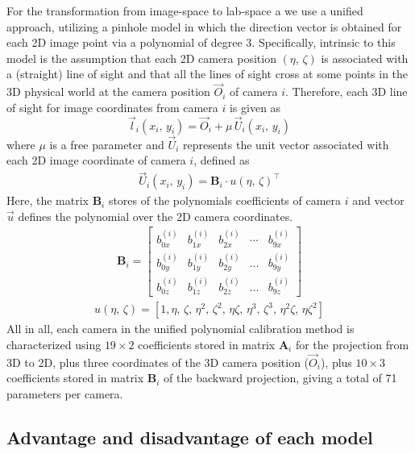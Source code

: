 \documentclass[10pt,a4paper]{article}
\begin{document}
For the transformation from image-space to lab-space a we use a unified approach, utilizing a pinhole model in which the direction vector is obtained for each 2D image point via a polynomial of degree 3. Specifically, intrinsic to this model is the assumption that each 2D camera position $(\eta,\, \zeta)$ is associated with a (straight) line of sight and that all the lines of sight cross at some points in the 3D physical world at the camera position $\vec{O}_i$ of camera $i$. Therefore, each 3D line of sight for image coordinates from camera $i$ is given as
%
\begin{equation}
\vec l_i(x_i, \, y_i) = \vec{O}_i + \mu\,\vec{U}_i(x_i, \, y_i) 
\end{equation}
%
where $\mu$ is a free parameter and $\vec{U}_i$ represents the unit vector associated with each 2D image coordinate of camera $i$, defined as
%
\begin{align}
\label{Eq::extendedSoloff_backwards}
\vec{U}_i(x_i, \, y_i) = \mathbf{B}_i \cdot u(\eta, \, \zeta)^\top
\end{align}
%
Here, the matrix $\mathbf{B}_i$ stores of the polynomials coefficients of camera $i$ and vector $\vec{u}$ defines the polynomial over the 2D camera coordinates.
\begin{align}
\mathbf{B}_i = 
\begin{bmatrix}
b^{(i)}_{0x} & b^{(i)}_{1x} & b^{(i)}_{2x} &  \cdots & b^{(i)}_{9x}\\[2pt]
b^{(i)}_{0y} & b^{(i)}_{1y} & b^{(i)}_{2y} &  \ldots & b^{(i)}_{9y}\\[2pt]
b^{(i)}_{0z} & b^{(i)}_{1z} & b^{(i)}_{2z} &  \ldots & b^{(i)}_{9z}
\end{bmatrix}
\end{align} 
%
\begin{align}
u(\eta, \, \zeta) = \left[1, \eta,\,  \zeta,\, \eta^2,\, \zeta^2,\, \eta \zeta,\, \eta^3,\, \zeta^3,\, \eta^2 \zeta,\, \eta \zeta^2\right]
\end{align}
%
All in all, each camera in the unified polynomial calibration method is characterized using $19\times 2$ coefficients stored in matrix $\mathbf{A}_i$ for the projection from 3D to 2D, plus three coordinates of the 3D camera position ($\vec{O}_i$), plus $10\times 3$ coefficients stored in matrix $\mathbf{B}_i$ of the backward projection, giving a total of 71 parameters per camera. 





\subsection{Advantage and disadvantage of each model}
\end{document}
